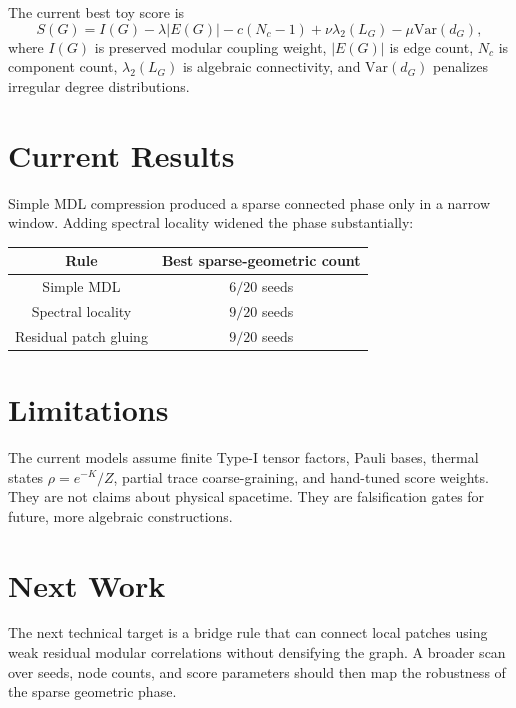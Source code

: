 \documentclass[11pt]{article}
\begin{document}
The current best toy score is
\begin{equation}
S(G) = I(G) - \lambda |E(G)| - c(N_c-1) + \nu \lambda_2(L_G) - \mu \mathrm{Var}(d_G),
\end{equation}
where $I(G)$ is preserved modular coupling weight, $|E(G)|$ is edge count, $N_c$ is component count, $\lambda_2(L_G)$ is algebraic connectivity, and $\mathrm{Var}(d_G)$ penalizes irregular degree distributions.

\section{Current Results}

Simple MDL compression produced a sparse connected phase only in a narrow window. Adding spectral locality widened the phase substantially:
\begin{center}
\begin{tabular}{c|c}
Rule & Best sparse-geometric count \\
\hline
Simple MDL & $6/20$ seeds \\
Spectral locality & $9/20$ seeds \\
Residual patch gluing & $9/20$ seeds \\
\end{tabular}
\end{center}

\section{Limitations}

The current models assume finite Type-I tensor factors, Pauli bases, thermal states $\rho = e^{-K}/Z$, partial trace coarse-graining, and hand-tuned score weights. They are not claims about physical spacetime. They are falsification gates for future, more algebraic constructions.

\section{Next Work}

The next technical target is a bridge rule that can connect local patches using weak residual modular correlations without densifying the graph. A broader scan over seeds, node counts, and score parameters should then map the robustness of the sparse geometric phase.



\end{document}

